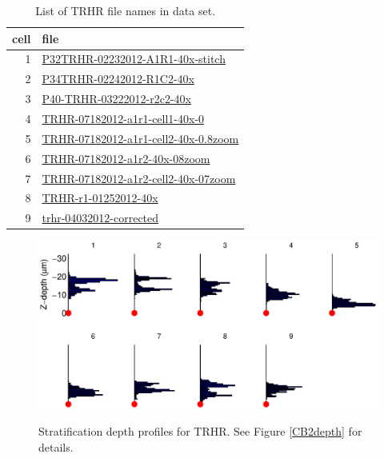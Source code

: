 \documentclass{article}
\begin{document}
\begin{table}
  \centering
  \begin{tabular}{rl}
    \toprule
    cell & file \\
    \midrule
1& \url{P32TRHR-02232012-A1R1-40x-stitch} \\
2& \url{P34TRHR-02242012-R1C2-40x} \\
3& \url{P40-TRHR-03222012-r2c2-40x} \\
4& \url{TRHR-07182012-a1r1-cell1-40x-0} \\
5& \url{TRHR-07182012-a1r1-cell2-40x-0.8zoom} \\
6& \url{TRHR-07182012-a1r2-40x-08zoom} \\
7& \url{TRHR-07182012-a1r2-cell2-40x-07zoom} \\
8& \url{TRHR-r1-01252012-40x} \\
9& \url{trhr-04032012-corrected} \\
\bottomrule
  \end{tabular}
  \caption{List of TRHR file names in data set.}

\end{table}


\begin{figure}
  \centering
  {\includegraphics[scale=1]{Figures/SupFig2/TRHR-stratification-depth-1}}
  \caption{Stratification depth profiles for TRHR. See Figure
    \ref{CB2depth} for details.}
\end{figure}

\clearpage
\end{document}

